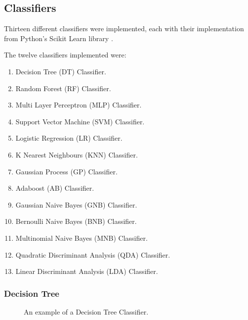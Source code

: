 \subsection{Classifiers}

Thirteen different classifiers were implemented, each with their implementation from Python's Scikit Learn library \cite{scikit-learn}.

The twelve classifiers implemented were:
\begin{enumerate}
    \item Decision Tree (DT) Classifier.
    \item Random Forest (RF) Classifier.
    \item Multi Layer Perceptron (MLP) Classifier.
    \item Support Vector Machine (SVM) Classifier.
    \item Logistic Regression (LR) Classifier.
    \item K Nearest Neighbours (KNN) Classifier.
    \item Gaussian Process (GP) Classifier.
    \item Adaboost (AB) Classifier.
    \item Gaussian Naive Bayes (GNB) Classifier.
    \item Bernoulli Naive Bayes (BNB) Classifier.
    \item Multinomial Naive Bayes (MNB) Classifier.
    \item Quadratic Discriminant Analysis (QDA) Classifier.
    \item Linear Discriminant Analysis (LDA) Classifier.
\end{enumerate}

\subsubsection*{Decision Tree}

\begin{figure}[h!]
\centering
{}
\caption{\label{fig:decisiontree} An example of a Decision Tree Classifier.}
\end{figure}

